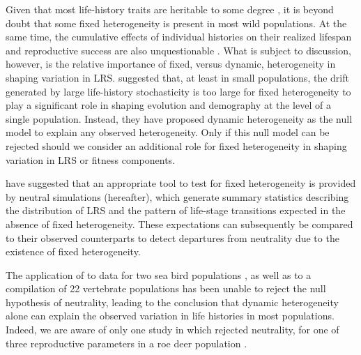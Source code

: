 Given that most life-history traits are heritable to some degree \parencite{Mousseau1987, Postma2014}, it is beyond doubt that some fixed heterogeneity is present in most wild populations. At the same time, the cumulative effects of individual histories on their realized lifespan and reproductive success are also unquestionable \parencite{Caswell2011}. What is subject to discussion, however, is the relative importance of fixed, versus dynamic, heterogeneity in shaping variation in LRS. \cite{Steiner2012} suggested that, at least in small populations, the drift generated by large life-history stochasticity is too large for fixed heterogeneity to play a significant role in shaping evolution and demography at the level of a single population. Instead, they have proposed dynamic heterogeneity as the null model to explain any observed heterogeneity. Only if this null model can be rejected should we consider an additional role for fixed heterogeneity in shaping variation in LRS or fitness components. 

\cite{Tuljapurkar2009} have suggested that an appropriate tool to test for fixed heterogeneity is provided by neutral simulations (\NSM hereafter), which generate summary statistics describing the distribution of LRS and the pattern of life-stage transitions expected in the absence of fixed heterogeneity. These expectations can subsequently be compared to their observed counterparts to detect departures from neutrality due to the existence of fixed heterogeneity. 

The application of \NSM to data for two sea bird populations \parencite{Steiner2010,Orzack2011}, as well as to a compilation of 22 vertebrate populations \parencite{Tuljapurkar2009} has been unable to reject the null hypothesis of neutrality, leading to the conclusion that dynamic heterogeneity alone can explain the observed variation in life histories in most populations. Indeed, we are aware of only one study in which \NSM rejected neutrality, for one of three reproductive parameters in a roe deer population \parencite{Plard2012}. 

